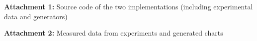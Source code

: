 \documentclass[12pt,a4paper]{report}
\let\openright=\clearpage
\begin{document}



\tableofcontents

\listoftodos















\listoffigures





{\bf Attachment 1:} Source code of the two implementations (including experimental
data and generators)

\bigskip

\noindent
{\bf Attachment 2:} Measured data from experiments and generated charts

\openright
\end{document}
